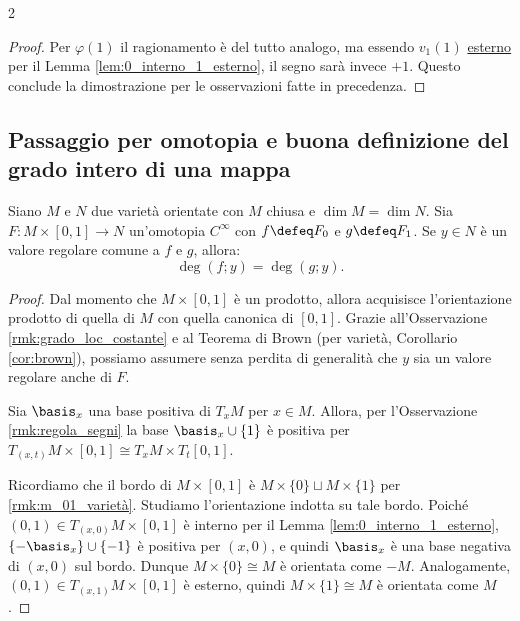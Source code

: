 \begin{multicols*}{2}
\begin{proof}
        Per $\varphi(1)$ il ragionamento è del tutto analogo, ma essendo $v_1(1)$ \underline{esterno} per
        il Lemma \ref{lem:0_interno_1_esterno}, il segno sarà invece $+1$. Questo conclude la dimostrazione
        per le osservazioni fatte in precedenza.
    \end{proof}

    \subsection{Passaggio per omotopia e buona definizione del grado intero di una mappa}

    \begin{lemma} \label{lem:omotopia_intero}
        Siano $M$ e $N$ due varietà orientate con $M$ chiusa e $\dim M = \dim N$.
        Sia $F : M \times [0, 1] \to N$ un'omotopia $C^\infty$ con $f \defeq F_0$
        e $g \defeq F_1$. Se $y \in N$ è un valore regolare comune a $f$ e $g$,
        allora:
        \[ \boxed{\deg(f; y) = \deg(g; y).} \]
    \end{lemma}

    \begin{proof}
        Dal momento che $M \times [0, 1]$ è un prodotto, allora acquisisce l'orientazione
        prodotto di quella di $M$ con quella canonica di $[0, 1]$. Grazie
        all'Osservazione \ref{rmk:grado_loc_costante} e al Teorema di Brown (per varietà, Corollario \ref{cor:brown}),
        possiamo assumere senza perdita di generalità che $y$ sia un valore regolare anche di $F$. \smallskip

        Sia $\basis_x$ una base positiva di $T_x M$ per $x \in M$. Allora,
        per l'Osservazione \ref{rmk:regola_segni} la base $\basis_x \cup \{1\}$
        è positiva per $T_{(x, t)} M \times [0, 1] \cong T_x M \times T_t [0, 1]$. \smallskip

        Ricordiamo che il bordo di $M \times [0, 1]$ è $M \times \{0\} \sqcup M \times \{1\}$
        per \ref{rmk:m_01_varietà}. Studiamo l'orientazione indotta su tale bordo.
        Poiché $(0, 1) \in T_{(x, 0)} M \times [0, 1]$ è interno per il Lemma \ref{lem:0_interno_1_esterno},
        $\{-\basis_x\} \cup \{-1\}$ è positiva per $(x, 0)$, e quindi $\basis_x$ è una base negativa di $(x, 0)$ sul
        bordo. Dunque $M \times \{0\} \cong M$ è orientata come $-M$. Analogamente, $(0, 1) \in T_{(x, 1)} M \times [0, 1]$ è
        esterno, quindi $M \times \{1\} \cong M$ è orientata come $M$. \smallskip


\end{proof}
\end{multicols*}
